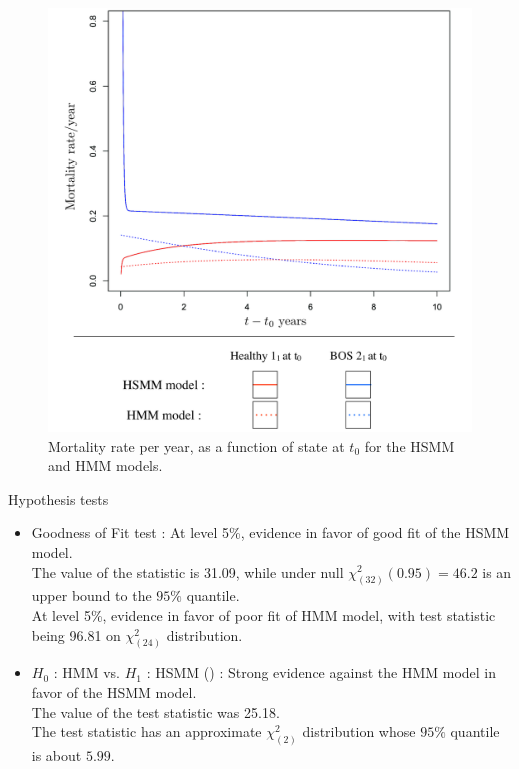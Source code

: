 \documentclass{beamer}
\begin{document}
\begin{frame}
\begin{figure}
\centering
\includegraphics[scale=0.25]{mortcomp_hsmmhmm.pdf}
\caption{Mortality rate per year, as a function of state at $t_0$ for the HSMM and HMM models.}
\end{figure}
\end{frame}
\begin{frame}{Hypothesis tests}
\begin{itemize}
\item Goodness of Fit test \citep{titman2008general} : At level 5\%, evidence in favor of good fit of the HSMM model.\\ \vspace{2mm}  The value of the statistic is 31.09,  while under null $\chi^2_{(32)} (0.95)=46.2$ is an upper bound to the $95\%$ quantile.\\ \vspace{2mm} 
At level 5\%, evidence in favor of poor fit of HMM model, with test statistic being 96.81 on $\chi^2_{(24)}$ distribution.\vspace{3mm}
\item $H_0$ : HMM vs. $H_1$ : HSMM (\cite{chen2001modified}) : Strong evidence against the HMM model in favor of the HSMM model.\\ \vspace{2mm} The value of the test statistic was 25.18.\\ \vspace{2mm} The test statistic has an approximate $\chi^2_{(2)}$ distribution whose $95\%$ quantile is about $5.99$.
\end{itemize}
\end{frame}
\end{document}
